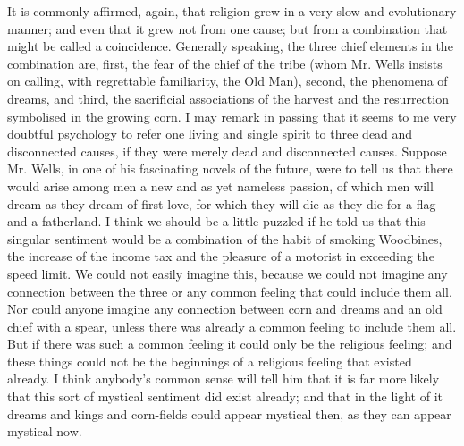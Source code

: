 It is commonly affirmed, again, that religion grew in a very slow and evolutionary manner; and even that it grew not from one cause; but from a combination that might be called a coincidence. Generally speaking, the three chief elements in the combination are, first, the fear of the chief of the tribe (whom Mr. Wells insists on calling, with regrettable familiarity, the Old Man), second, the phenomena of dreams, and third, the sacrificial associations of the harvest and the resurrection symbolised in the growing corn. I may remark in passing that it seems to me very doubtful psychology to refer one living and single spirit to three dead and disconnected causes, if they were merely dead and disconnected causes. Suppose Mr. Wells, in one of his fascinating novels of the future, were to tell us that there would arise among men a new and as yet nameless passion, of which men will dream as they dream of first love, for which they will die as they die for a flag and a fatherland. I think we should be a little puzzled if he told us that this singular sentiment would be a combination of the habit of smoking Woodbines, the increase of the income tax and the pleasure of a motorist in exceeding the speed limit. We could not easily imagine this, because we could not imagine any connection between the three or any common feeling that could include them all. Nor could anyone imagine any connection between corn and dreams and an old chief with a spear, unless there was already a common feeling to include them all. But if there was such a common feeling it could only be the religious feeling; and these things could not be the beginnings of a religious feeling that existed already. I think anybody's common sense will tell him that it is far more likely that this sort of mystical sentiment did exist already; and that in the light of it dreams and kings and corn-fields could appear mystical then, as they can appear mystical now.

